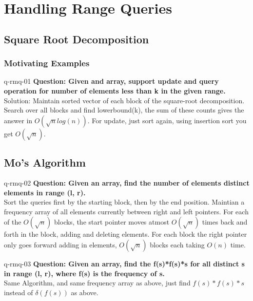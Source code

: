 \chapter{Handling Range Queries}



\section{Square Root Decomposition}


\subsection{Motivating Examples}

\begin{example}{q-rmq-01}
    \textbf{Question: Given and array, support update and query operation for number of elements less than k in the given range.} \\
    Solution: Maintain sorted vector of each block of the square-root decomposition. Search over all blocks and find lowerbound(k), the sum of these counts gives the answer in $O(\sqrt{n} log(n))$. For update, just sort again, using insertion sort you get $O(\sqrt{n})$.
\end{example}



\section{Mo's Algorithm}

\begin{example}{q-rmq-02}
    \textbf{Question: Given an array, find the number of elements distinct elements in range (l, r).} \\
    Sort the queries first by the starting block, then by the end position. Maintian a frequency array of all elements currently between right and left pointers. For each of the $O(\sqrt{n})$ blocks, the start pointer moves atmost $O(\sqrt{n})$ times back and forth in the block, adding and deleting elements. For each block the right pointer only goes forward adding in elements, $O(\sqrt{n})$ blocks each taking $O(n)$ time.
\end{example}

\begin{example}{q-rmq-03}
    \textbf{Question: Given an array, find the f(s)*f(s)*s for all distinct s in range (l, r), where f(s) is the frequency of s.} \\
    Same Algorithm, and same frequency array as above, just find $f(s)*f(s)*s$ instead of $\delta(f(s))$ as above.
\end{example}
